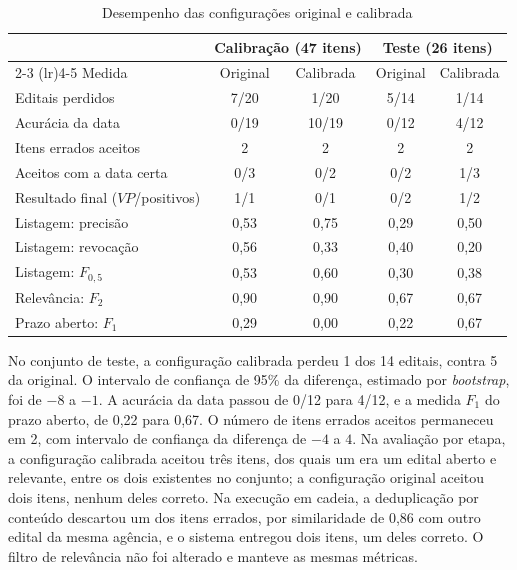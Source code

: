 \begin{table}[htbp]
\centering
\caption{Desempenho das configurações original e calibrada}
\label{tab:resultados}
\small
\begin{tabular}{l c c c c}
\toprule
 & \multicolumn{2}{c}{Calibração (47 itens)} & \multicolumn{2}{c}{Teste (26 itens)} \\
\cmidrule(lr){2-3} \cmidrule(lr){4-5}
Medida & Original & Calibrada & Original & Calibrada \\
\midrule
Editais perdidos                 & 7/20  & 1/20  & 5/14  & 1/14 \\
Acurácia da data                 & 0/19  & 10/19 & 0/12  & 4/12 \\
Itens errados aceitos            & 2     & 2     & 2     & 2    \\
Aceitos com a data certa         & 0/3   & 0/2   & 0/2   & 1/3  \\
Resultado final ($VP$/positivos) & 1/1   & 0/1   & 0/2   & 1/2  \\
\midrule
Listagem: precisão               & 0,53  & 0,75  & 0,29  & 0,50 \\
Listagem: revocação              & 0,56  & 0,33  & 0,40  & 0,20 \\
Listagem: $F_{0{,}5}$            & 0,53  & 0,60  & 0,30  & 0,38 \\
Relevância: $F_2$                & 0,90  & 0,90  & 0,67  & 0,67 \\
Prazo aberto: $F_1$              & 0,29  & 0,00  & 0,22  & 0,67 \\
\bottomrule
\end{tabular}
\end{table}

No conjunto de teste, a configuração calibrada perdeu 1 dos 14 editais, contra
5 da original. O intervalo de confiança de 95\% da diferença, estimado por
\textit{bootstrap}, foi de $-8$ a $-1$. A acurácia da data passou de 0/12 para
4/12, e a medida $F_1$ do prazo aberto, de 0,22 para 0,67. O número de itens
errados aceitos permaneceu em 2, com intervalo de confiança da diferença de
$-4$ a $4$. Na avaliação por etapa, a configuração calibrada aceitou três
itens, dos quais um era um edital aberto e relevante, entre os dois existentes
no conjunto; a configuração original aceitou dois itens, nenhum deles correto.
Na execução em cadeia, a deduplicação por conteúdo descartou um dos itens
errados, por similaridade de 0,86 com outro edital da mesma agência, e o
sistema entregou dois itens, um deles correto. O filtro de relevância não foi
alterado e manteve as mesmas métricas.


